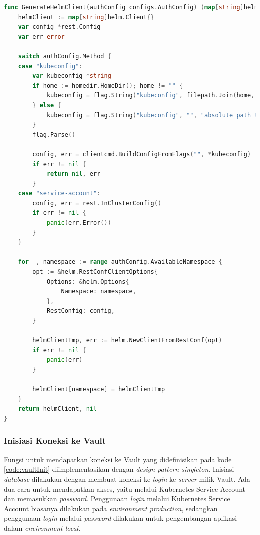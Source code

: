 \begin{lstlisting}[frame=single,language=Go,caption={Fungsi untuk inisiasi koneksi ke Helm},label={code:helmInit}]
func GenerateHelmClient(authConfig configs.AuthConfig) (map[string]helm.Client, error) {
	helmClient := map[string]helm.Client{}
	var config *rest.Config
	var err error

	switch authConfig.Method {
	case "kubeconfig":
		var kubeconfig *string
		if home := homedir.HomeDir(); home != "" {
			kubeconfig = flag.String("kubeconfig", filepath.Join(home, ".kube", "config"), "(optional) absolute path to the kubeconfig file")
		} else {
			kubeconfig = flag.String("kubeconfig", "", "absolute path to the kubeconfig file")
		}
		flag.Parse()

		config, err = clientcmd.BuildConfigFromFlags("", *kubeconfig)
		if err != nil {
			return nil, err
		}
	case "service-account":
		config, err = rest.InClusterConfig()
		if err != nil {
			panic(err.Error())
		}
	}

	for _, namespace := range authConfig.AvailableNamespace {
		opt := &helm.RestConfClientOptions{
			Options: &helm.Options{
				Namespace: namespace,
			},
			RestConfig: config,
		}

		helmClientTmp, err := helm.NewClientFromRestConf(opt)
		if err != nil {
			panic(err)
		}

		helmClient[namespace] = helmClientTmp
	}
	return helmClient, nil
}
\end{lstlisting}

\subsubsection{Inisiasi Koneksi ke Vault}
\label{sec:initVault}

Fungsi untuk mendapatkan koneksi ke Vault yang didefinisikan pada kode \ref{code:vaultInit} diimplementasikan dengan \textit{design pattern singleton}. Inisiasi \textit{database} dilakukan dengan membuat koneksi ke \textit{login} ke \textit{server} milik Vault. Ada dua cara untuk mendapatkan akses, yaitu melalui Kubernetes Service Account dan memasukkan \textit{password}. Penggunaan \textit{login} melalui Kubernetes Service Account biasanya dilakukan pada \textit{environment production}, sedangkan penggunaan \textit{login} melalui \textit{password} dilakukan untuk pengembangan aplikasi dalam \textit{environment local}.

